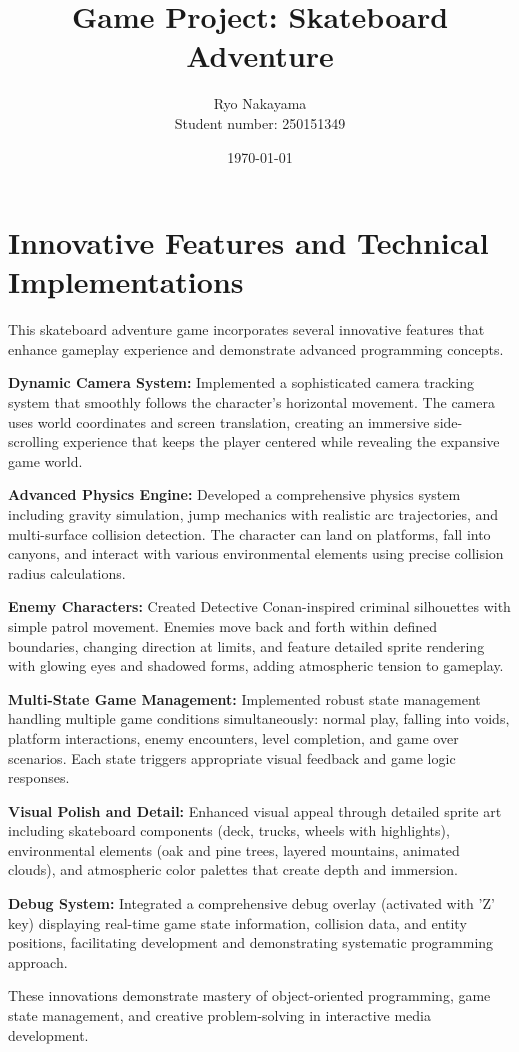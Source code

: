 \documentclass[11pt,a4paper]{article}
\title{Game Project: Skateboard Adventure}
\author{Ryo Nakayama \\ Student number: 250151349}
\date{\today}
\begin{document}
\maketitle

\section*{Innovative Features and Technical Implementations}

This skateboard adventure game incorporates several innovative features that enhance gameplay experience and demonstrate advanced programming concepts.

\textbf{Dynamic Camera System:} Implemented a sophisticated camera tracking system that smoothly follows the character's horizontal movement. The camera uses world coordinates and screen translation, creating an immersive side-scrolling experience that keeps the player centered while revealing the expansive game world.

\textbf{Advanced Physics Engine:} Developed a comprehensive physics system including gravity simulation, jump mechanics with realistic arc trajectories, and multi-surface collision detection. The character can land on platforms, fall into canyons, and interact with various environmental elements using precise collision radius calculations.

\textbf{Enemy Characters:} Created Detective Conan-inspired criminal silhouettes with simple patrol movement. Enemies move back and forth within defined boundaries, changing direction at limits, and feature detailed sprite rendering with glowing eyes and shadowed forms, adding atmospheric tension to gameplay.

\textbf{Multi-State Game Management:} Implemented robust state management handling multiple game conditions simultaneously: normal play, falling into voids, platform interactions, enemy encounters, level completion, and game over scenarios. Each state triggers appropriate visual feedback and game logic responses.

\textbf{Visual Polish and Detail:} Enhanced visual appeal through detailed sprite art including skateboard components (deck, trucks, wheels with highlights), environmental elements (oak and pine trees, layered mountains, animated clouds), and atmospheric color palettes that create depth and immersion.

\textbf{Debug System:} Integrated a comprehensive debug overlay (activated with 'Z' key) displaying real-time game state information, collision data, and entity positions, facilitating development and demonstrating systematic programming approach.

These innovations demonstrate mastery of object-oriented programming, game state management, and creative problem-solving in interactive media development.
\end{document}
